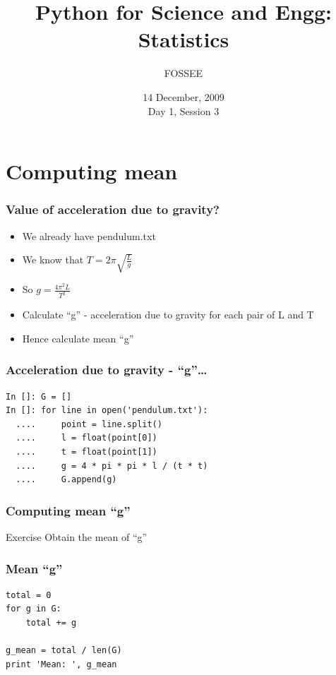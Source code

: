 \documentclass[14pt,compress]{beamer}
\title[Statistics]{Python for Science and Engg: Statistics}
\author[FOSSEE] {FOSSEE}
\institute[IIT Bombay] {Department of Aerospace Engineering\\IIT Bombay}
\date[] {14 December, 2009\\Day 1, Session 3}
\begin{document}
\begin{frame}
  \maketitle
\end{frame}


\section{Computing mean}
\begin{frame}
  \frametitle{Value of acceleration due to gravity?}
  \begin{itemize}
    \item We already have pendulum.txt
    \item We know that $ T = 2\pi \sqrt{\frac{L}{g}} $
    \item So $ g = \frac{4 \pi^2 L}{T^2}  $
    \item Calculate ``g'' - acceleration due to gravity for each pair of L and T
    \item Hence calculate mean ``g''
  \end{itemize}
\end{frame}

\begin{frame}[fragile]
  \frametitle{Acceleration due to gravity - ``g''\ldots}
  \begin{lstlisting}
In []: G = []
In []: for line in open('pendulum.txt'):
  ....     point = line.split()
  ....     l = float(point[0])
  ....     t = float(point[1])
  ....     g = 4 * pi * pi * l / (t * t)
  ....     G.append(g)
  \end{lstlisting}
\end{frame}

\begin{frame}
  \frametitle{Computing mean ``g''}
  \begin{block}{Exercise}
    Obtain the mean of ``g''
  \end{block}
\end{frame}

\begin{frame}[fragile]
  \frametitle{Mean ``g''}
  \begin{lstlisting}
total = 0
for g in G:
    total += g

g_mean = total / len(G)
print 'Mean: ', g_mean
  \end{lstlisting}
\end{frame}
\end{document}
